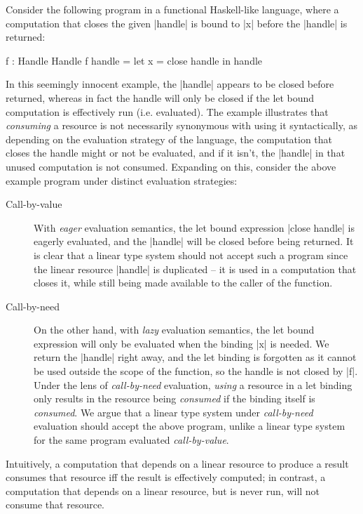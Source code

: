 \documentclass[acmsmall, screen, review]{acmart}
\newcommand{\lolli}{\multimap}
\begin{document}
Consider the following program in a functional Haskell-like language,
where a computation that closes the given |handle| is bound to |x| before the
|handle| is returned:
%
\begin{code}
f : Handle \lolli Handle
f handle = let x = close handle in handle
\end{code}
%
In this seemingly innocent example, the |handle| appears to be closed before
returned, whereas in fact the handle will only be closed if the let bound
computation is effectively run (i.e. evaluated).
%
The example illustrates that \emph{consuming} a resource is not necessarily
synonymous with using it syntactically, as depending on the evaluation strategy
of the language, the computation that closes the handle might or not be
evaluated, and if it isn't, the |handle| in that unused computation
is not consumed.
%
Expanding on this, consider the above example program under distinct
evaluation strategies:
%
\begin{description}

\item[Call-by-value] With \emph{eager} evaluation semantics, the let bound expression |close
handle| is eagerly evaluated, and the |handle| will be closed before being
returned. It is clear that a linear type system should not accept such a
program since the linear resource |handle| is duplicated -- it is used in a
computation that closes it, while still being made available to the caller of
the function.

\item[Call-by-need] On the other hand, with \emph{lazy} evaluation semantics, the let
bound expression will only be evaluated when the binding |x| is needed. We return
the |handle| right away, and the let binding is forgotten as it cannot be
used outside the scope of the function, so the handle is not closed by |f|.
Under the lens of \emph{call-by-need} evaluation, \emph{using} a resource in a
let binding only results in the resource being \emph{consumed} if the binding
itself is \emph{consumed}. We argue that a linear type system under
\emph{call-by-need} evaluation should accept the above program, unlike a linear
type system for the same program evaluated \emph{call-by-value}.

\end{description}
%
%
%
%
Intuitively, a computation that depends on a linear resource to produce a
result consumes that resource iff the result is effectively computed; in
contrast, a computation that depends on a linear resource, but is never run,
will not consume that resource.
\end{document}
